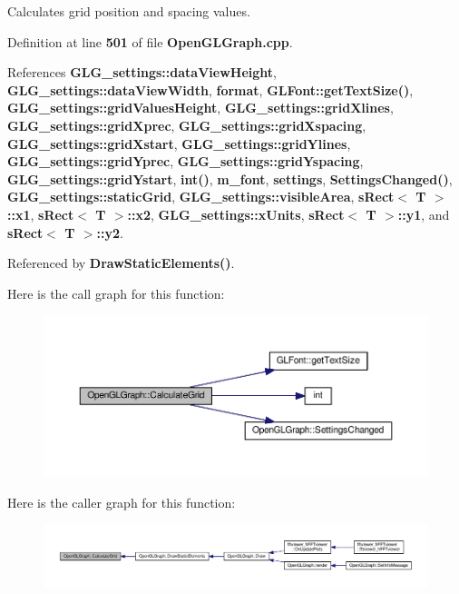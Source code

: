 Calculates grid position and spacing values. 



Definition at line {\bf 501} of file {\bf Open\+G\+L\+Graph.\+cpp}.



References {\bf G\+L\+G\+\_\+settings\+::data\+View\+Height}, {\bf G\+L\+G\+\_\+settings\+::data\+View\+Width}, {\bf format}, {\bf G\+L\+Font\+::get\+Text\+Size()}, {\bf G\+L\+G\+\_\+settings\+::grid\+Values\+Height}, {\bf G\+L\+G\+\_\+settings\+::grid\+Xlines}, {\bf G\+L\+G\+\_\+settings\+::grid\+Xprec}, {\bf G\+L\+G\+\_\+settings\+::grid\+Xspacing}, {\bf G\+L\+G\+\_\+settings\+::grid\+Xstart}, {\bf G\+L\+G\+\_\+settings\+::grid\+Ylines}, {\bf G\+L\+G\+\_\+settings\+::grid\+Yprec}, {\bf G\+L\+G\+\_\+settings\+::grid\+Yspacing}, {\bf G\+L\+G\+\_\+settings\+::grid\+Ystart}, {\bf int()}, {\bf m\+\_\+font}, {\bf settings}, {\bf Settings\+Changed()}, {\bf G\+L\+G\+\_\+settings\+::static\+Grid}, {\bf G\+L\+G\+\_\+settings\+::visible\+Area}, {\bf s\+Rect$<$ T $>$\+::x1}, {\bf s\+Rect$<$ T $>$\+::x2}, {\bf G\+L\+G\+\_\+settings\+::x\+Units}, {\bf s\+Rect$<$ T $>$\+::y1}, and {\bf s\+Rect$<$ T $>$\+::y2}.



Referenced by {\bf Draw\+Static\+Elements()}.



Here is the call graph for this function\+:
\nopagebreak
\begin{figure}[H]
\begin{center}
\leavevmode
\includegraphics[width=350pt]{d9/d73/classOpenGLGraph_a14351720e768aaae6207e88bc8abf331_cgraph}
\end{center}
\end{figure}




Here is the caller graph for this function\+:
\nopagebreak
\begin{figure}[H]
\begin{center}
\leavevmode
\includegraphics[width=350pt]{d9/d73/classOpenGLGraph_a14351720e768aaae6207e88bc8abf331_icgraph}
\end{center}
\end{figure}


